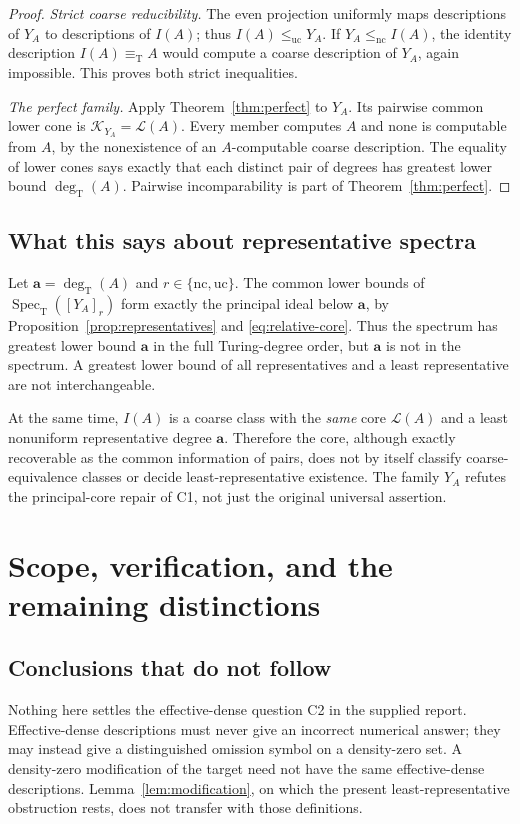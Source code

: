 \documentclass[11pt,a4paper]{article}
\newcommand{\eqT}{\equiv_{\mathrm T}}
\newcommand{\nc}{\mathrm{nc}}
\newcommand{\uc}{\mathrm{uc}}
\newcommand{\Core}[1]{\mathcal K_{#1}}
\newcommand{\Low}[1]{\mathcal L(#1)}
\newcommand{\Spec}{\operatorname{Spec}_{\mathrm T}}
\newcommand{\degT}{\operatorname{deg}_{\mathrm T}}
\theoremstyle{definition}\newtheorem{definition}[theorem]{Definition}
\theoremstyle{remark}\newtheorem{remark}[theorem]{Remark}
\begin{document}
\begin{proof}
\emph{Strict coarse reducibility.} The even projection uniformly maps descriptions of $Y_A$ to descriptions of $I(A)$; thus $I(A)\le_{\uc}Y_A$. If $Y_A\le_{\nc}I(A)$, the identity description $I(A)\eqT A$ would compute a coarse description of $Y_A$, again impossible. This proves both strict inequalities.

\emph{The perfect family.} Apply Theorem~\ref{thm:perfect} to $Y_A$. Its pairwise common lower cone is $\Core{Y_A}=\Low A$. Every member computes $A$ and none is computable from $A$, by the nonexistence of an $A$-computable coarse description. The equality of lower cones says exactly that each distinct pair of degrees has greatest lower bound $\degT(A)$. Pairwise incomparability is part of Theorem~\ref{thm:perfect}.
\end{proof}

\subsection{What this says about representative spectra}
Let $\mathbf a=\degT(A)$ and $r\in\{\nc,\uc\}$. The common lower bounds of $\Spec([Y_A]_r)$ form exactly the principal ideal below $\mathbf a$, by Proposition~\ref{prop:representatives} and \eqref{eq:relative-core}. Thus the spectrum has greatest lower bound $\mathbf a$ in the full Turing-degree order, but $\mathbf a$ is not in the spectrum. A greatest lower bound of all representatives and a least representative are not interchangeable.

At the same time, $I(A)$ is a coarse class with the \emph{same} core $\Low A$ and a least nonuniform representative degree $\mathbf a$. Therefore the core, although exactly recoverable as the common information of pairs, does not by itself classify coarse-equivalence classes or decide least-representative existence. The family $Y_A$ refutes the principal-core repair of C1, not just the original universal assertion.

\section{Scope, verification, and the remaining distinctions}
\label{sec:limits}
\subsection{Conclusions that do not follow}
Nothing here settles the effective-dense question C2 in the supplied report. Effective-dense descriptions must never give an incorrect numerical answer; they may instead give a distinguished omission symbol on a density-zero set. A density-zero modification of the target need not have the same effective-dense descriptions. Lemma~\ref{lem:modification}, on which the present least-representative obstruction rests, does not transfer with those definitions.\cite[entry C2]{Input}\cite[Definitions 2.7--2.8]{Gerdes}
\end{document}
